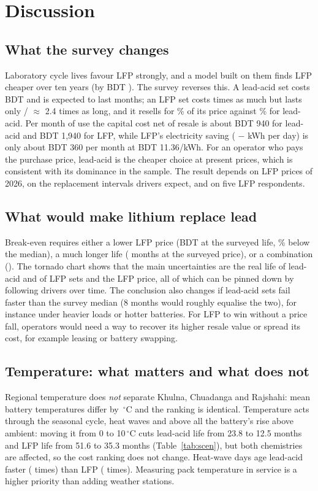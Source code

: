 \section{Discussion}
\label{sec:disc}
\subsection{What the survey changes}
Laboratory cycle lives favour LFP strongly, and a model built on them finds LFP cheaper over ten years (by BDT \litGap{}). The survey reverses this. A lead-acid set costs BDT \costMedLA{} and is expected to last \replMedLA{} months; an LFP set costs \costRatio{} times as much but lasts only \replMedLFP{}/\replMedLA{} $\approx$ 2.4 times as long, and it resells for \scrapLFP\% of its price against \scrapLA\% for lead-acid. Per month of use the capital cost net of resale is about BDT 940 for lead-acid and BDT 1{,}940 for LFP, while LFP's electricity saving (\egLA{} $-$ \egLFP{} kWh per day) is only about BDT 360 per month at BDT 11.36/kWh. For an operator who pays the purchase price, lead-acid is the cheaper choice at present prices, which is consistent with its dominance in the sample. The result depends on LFP prices of 2026, on the replacement intervals drivers expect, and on five LFP respondents.

\subsection{What would make lithium replace lead}
Break-even requires either a lower LFP price (BDT \beP{} at the surveyed life, \bePpct\% below the median), a much longer life (\beL{} months at the surveyed price), or a combination (). The tornado chart shows that the main uncertainties are the real life of lead-acid and of LFP sets and the LFP price, all of which can be pinned down by following drivers over time. The conclusion also changes if lead-acid sets fail faster than the survey median (8 months would roughly equalise the two), for instance under heavier loads or hotter batteries. For LFP to win without a price fall, operators would need a way to recover its higher resale value or spread its cost, for example leasing or battery swapping.

\subsection{Temperature: what matters and what does not}
Regional temperature does \emph{not} separate Khulna, Chuadanga and Rajshahi: mean battery temperatures differ by \Tspread\,$^\circ$C and the ranking is identical. Temperature acts through the seasonal cycle, heat waves and above all the battery's rise above ambient: moving it from 0 to 10\,$^\circ$C cuts lead-acid life from 23.8 to 12.5 months and LFP life from 51.6 to 35.3 months (Table~\ref{tab:scen}), but both chemistries are affected, so the cost ranking does not change. Heat-wave days age lead-acid faster (\heatLA{} times) than LFP (\heatLFP{} times). Measuring pack temperature in service is a higher priority than adding weather stations.

